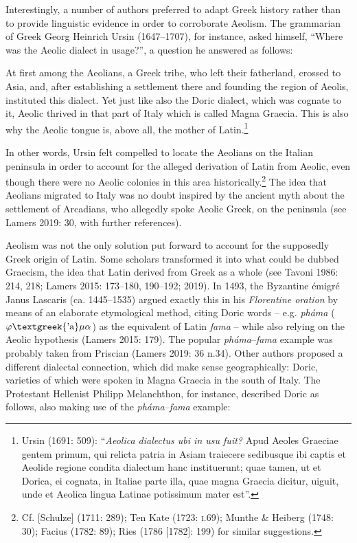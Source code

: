 \documentclass[12pt]{article}
\newenvironment{styleStandard}{\renewcommand\baselinestretch{1.25}\setlength\leftskip{0in}\setlength\rightskip{0in}\setlength\parindent{0.1972in}\setlength\parfillskip{0pt plus 1fil}\setlength\parskip{0in plus 1pt}\writerlistparindent\writerlistleftskip\leavevmode\normalfont\normalsize\writerlistlabel\ignorespaces}{\unskip\vspace{0in plus 1pt}\par}
\newenvironment{styleQuote}{\renewcommand\baselinestretch{1.25}\setlength\leftskip{0.3937in}\setlength\rightskip{0in}\setlength\parindent{0in}\setlength\parfillskip{0pt plus 1fil}\setlength\parskip{0.1665in plus 0.016649999in}\writerlistparindent\writerlistleftskip\leavevmode\normalfont\normalsize\writerlistlabel\ignorespaces}{\unskip\vspace{0.1665in plus 0.016649999in}\par}
\newcommand\writerlistleftskip{}
\newcommand\writerlistparindent{}
\newcommand\writerlistlabel{}
\begin{document}
\begin{styleStandard}
Interestingly, a number of authors preferred to adapt Greek history rather than to provide linguistic evidence in order to corroborate Aeolism. The grammarian of Greek Georg Heinrich Ursin (1647–1707), for instance, asked himself, “Where was the Aeolic dialect in usage?”, a question he answered as follows:
\end{styleStandard}

\begin{styleQuote}
At first among the Aeolians, a Greek tribe, who left their fatherland, crossed to Asia, and, after establishing a settlement there and founding the region of Aeolis, instituted this dialect. Yet just like also the Doric dialect, which was cognate to it, Aeolic thrived in that part of Italy which is called Magna Graecia. This is also why the Aeolic tongue is, above all, the mother of Latin.\footnote{ Ursin (1691: 509): “\textit{Aeolica dialectus ubi in usu fuit?} Apud Aeoles Graeciae gentem primum, qui relicta patria in Asiam traiecere sedibusque ibi captis et Aeolide regione condita dialectum hanc instituerunt; quae tamen, ut et Dorica, ei cognata, in Italiae parte illa, quae magna Graecia dicitur, uiguit, unde et Aeolica lingua Latinae potissimum mater est”.}
\end{styleQuote}

\begin{styleStandard}
In other words, Ursin felt compelled to locate the Aeolians on the Italian peninsula in order to account for the alleged derivation of Latin from Aeolic, even though there were no Aeolic colonies in this area historically.\footnote{ Cf. [Schulze] (1711: 289); Ten Kate (1723: \textsc{i}.69); Munthe \& Heiberg (1748: 30); Facius (1782: 89); Ries (1786 [1782]: 199) for similar suggestions.} The idea that Aeolians migrated to Italy was no doubt inspired by the ancient myth about the settlement of Arcadians, who allegedly spoke Aeolic Greek, on the peninsula (see Lamers 2019: 30, with further references).
\end{styleStandard}

\begin{styleStandard}
Aeolism was not the only solution put forward to account for the supposedly Greek origin of Latin. Some scholars transformed it into what could be dubbed Graecism, the idea that Latin derived from Greek as a whole (see Tavoni 1986: 214, 218; Lamers 2015: 173–180, 190–192; 2019). In 1493, the Byzantine émigré Janus Lascaris (ca. 1445–1535) argued exactly this in his \textit{Florentine oration} by means of an elaborate etymological method, citing Doric words – e.g. \textit{pháma }($\varphi \text{\textgreek{'a}}\mu \alpha $) as the equivalent of Latin \textit{fama} – while also relying on the Aeolic hypothesis (Lamers 2015: 179). The popular \textit{pháma}–\textit{fama }example was probably taken from Priscian (Lamers 2019: 36 n.34). Other authors proposed a different dialectal connection, which did make sense geographically: Doric, varieties of which were spoken in Magna Graecia in the south of Italy. The Protestant Hellenist Philipp Melanchthon, for instance, described Doric as follows, also making use of the \textit{pháma}–\textit{fama }example:
\end{styleStandard}
\end{document}
